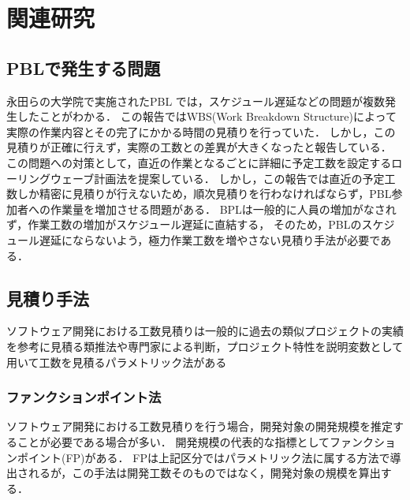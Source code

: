 \documentclass{compsoft}
\begin{document}
\section{関連研究} \label{Other-study}

\subsection{PBLで発生する問題} \label{occurred-problem}
永田らの大学院で実施されたPBL では，スケジュール遅延などの問題が複数発生したことがわかる\cite{nagata2011}．
この報告ではWBS(Work Breakdown Structure)によって実際の作業内容とその完了にかかる時間の見積りを行っていた．
しかし，この見積りが正確に行えず，実際の工数との差異が大きくなったと報告している．
この問題への対策として，直近の作業となるごとに詳細に予定工数を設定するローリングウェーブ計画法を提案している．
しかし，この報告では直近の予定工数しか精密に見積りが行えないため，順次見積りを行わなければならず，PBL参加者への作業量を増加させる問題がある．
BPLは一般的に人員の増加がなされず，作業工数の増加がスケジュール遅延に直結する，
そのため，PBLのスケジュール遅延にならないよう，極力作業工数を増やさない見積り手法が必要である．


\subsection{見積り手法} \label{estimation-method}
ソフトウェア開発における工数見積りは一般的に過去の類似プロジェクトの実績を参考に見積る類推法や専門家による判断，プロジェクト特性を説明変数として用いて工数を見積るパラメトリック法がある

\subsubsection{ファンクションポイント法} \label{fp}
ソフトウェア開発における工数見積りを行う場合，開発対象の開発規模を推定することが必要である場合が多い．
開発規模の代表的な指標としてファンクションポイント(FP)がある\cite{FP}．
FPは上記区分ではパラメトリック法に属する方法で導出されるが，この手法は開発工数そのものではなく，開発対象の規模を算出する．
\end{document}
